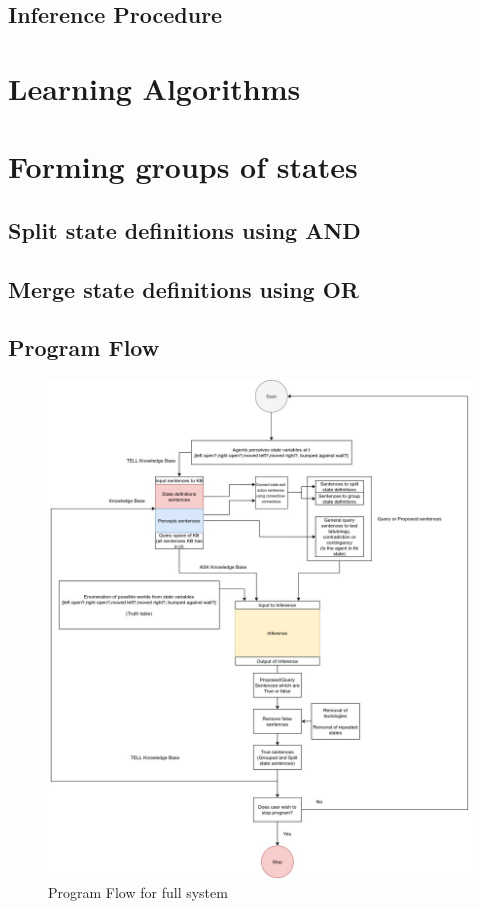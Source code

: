 \subsection{Inference Procedure}




\section{Learning Algorithms} 
\section{Forming groups of states}
\subsection{Split state definitions using AND}
\subsection{Merge state definitions using OR}
\newpage
\subsection{Program Flow}
\begin{figure}[H]
    \centering
    \includegraphics[scale=.4]{Figures/new_program_flow.jpg}
    \caption{Program Flow for full system} 
    \label{fig:program_flow}
\end{figure}